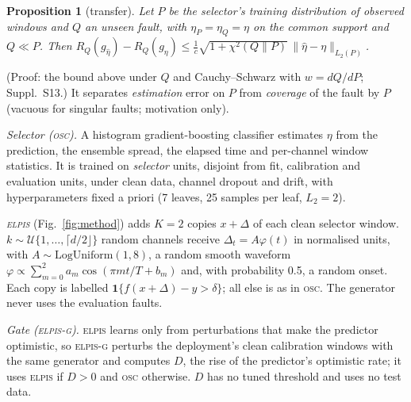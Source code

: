 \documentclass{esannV2}
\newtheorem{proposition}{Proposition}
\newcommand{\OSC}{\textsc{osc}}
\newcommand{\RPT}{\textsc{elpis}}
\newcommand{\AUTOD}{\textsc{elpis-g}}
\begin{document}
\begin{proposition}[transfer]\label{prop:transfer}
Let $P$ be the selector's training distribution of observed windows and $Q$ an unseen fault, with $\eta_P=\eta_Q=\eta$ on the common support and $Q\ll P$. Then
$R_Q(g_{\hat\eta})-R_Q(g_\eta)\le\frac1c\sqrt{1+\chi^2(Q\|P)}\,\|\hat\eta-\eta\|_{L_2(P)}$.
\end{proposition}
\noindent (Proof: the bound above under $Q$ and Cauchy--Schwarz with $w=dQ/dP$; Suppl.~S13.) It separates \emph{estimation} error on $P$ from \emph{coverage} of the fault by $P$ (vacuous for singular faults; motivation only).



\emph{Selector (\OSC).} A histogram gradient-boosting classifier estimates $\eta$ from the prediction, the ensemble spread, the elapsed time and per-channel window statistics. It is trained on \emph{selector} units, disjoint from fit, calibration and evaluation units, under clean data, channel dropout and drift, with hyperparameters fixed a priori (7 leaves, 25 samples per leaf, $L_2=2$).

\emph{\RPT{}} (Fig.~\ref{fig:method}) adds $K=2$ copies $x+\Delta$ of each clean selector window. $k\sim\mathcal U\{1,\dots,\lceil d/2\rfloor\}$ random channels receive $\Delta_{t}=A\varphi(t)$ in normalised units, with $A\sim\mathrm{LogUniform}(1,8)$, a random smooth waveform $\varphi\propto\sum_{m=0}^2a_m\cos(\pi mt/T+b_m)$ and, with probability 0.5, a random onset. Each copy is labelled $\mathbf 1\{f(x+\Delta)-y>\delta\}$; all else is as in \OSC. The generator never uses the evaluation faults.

\emph{Gate (\AUTOD).} \RPT{} learns only from perturbations that make the predictor optimistic, so \AUTOD{} perturbs the deployment's clean calibration windows with the same generator and computes $D$, the rise of the predictor's optimistic rate; it uses \RPT{} if $D>0$ and \OSC{} otherwise. $D$ has no tuned threshold and uses no test data.

\end{document}
